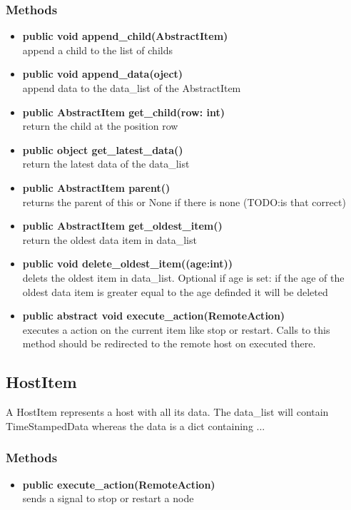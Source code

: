 \subsubsection{Methods}
\begin{itemize}
   \item \textbf{public void append\_child(AbstractItem)}\\ 
   append a child to the list of childs
  \item \textbf{public void append\_data(oject)}\\ 
  append data to the data\_list of the AbstractItem
  \item \textbf{public AbstractItem get\_child(row: int)}\\ 
  return the child at the position row
  \item \textbf{public object get\_latest\_data()}\\ 
  return the latest data of the data\_list
  \item \textbf{public AbstractItem parent()}\\ 
  returns the parent of this or None if there is none (TODO:is that correct)
  \item \textbf{public AbstractItem get\_oldest\_item()}\\ 
  return the oldest data item in data\_list
  \item \textbf{public void delete\_oldest\_item((age:int))}\\ 
  delets the oldest item in data\_list. Optional if age is set: if the age of the oldest data item is greater equal to the age definded it will be deleted
  \item \textbf{public abstract void execute\_action(RemoteAction)}\\ 
  executes a action on the current item like stop or restart. Calls to this
  method should be redirected to the remote host on executed there.
\end{itemize}

\subsection{HostItem}
A HostItem represents a host with all its data.
The data\_list will contain TimeStampedData whereas the data is a dict containing ...
\subsubsection{Methods}
\begin{itemize}
  \item \textbf{public execute\_action(RemoteAction)}\\
  sends a signal to stop or restart a node
\end{itemize}

